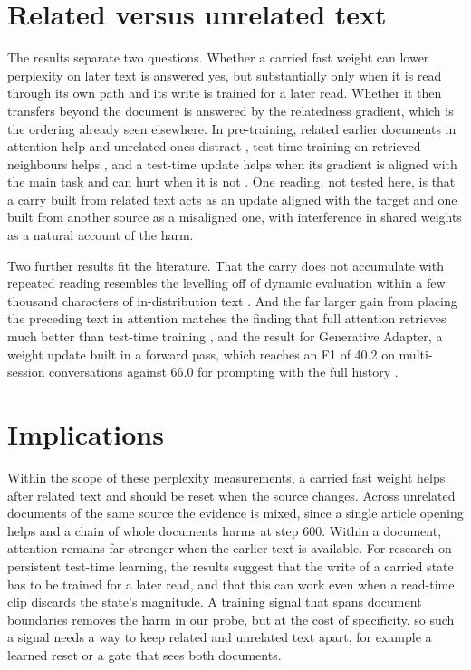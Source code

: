 \documentclass[12pt,a4paper]{report}
\begin{document}
\section{Related versus unrelated text}

The results separate two questions. Whether a carried fast weight can lower perplexity on later text is answered yes, but substantially only when it is read through its own path and its write is trained for a later read. Whether it then transfers beyond the document is answered by the relatedness gradient, which is the ordering already seen elsewhere. In pre-training, related earlier documents in attention help and unrelated ones distract \citep{zhao2024analysing}, test-time training on retrieved neighbours helps \citep{hardt2024test}, and a test-time update helps when its gradient is aligned with the main task and can hurt when it is not \citep{sun2020ttt,gandelsman2022ttt}. One reading, not tested here, is that a carry built from related text acts as an update aligned with the target and one built from another source as a misaligned one, with interference in shared weights \citep{french1999catastrophic} as a natural account of the harm.

Two further results fit the literature. That the carry does not accumulate with repeated reading resembles the levelling off of dynamic evaluation within a few thousand characters of in-distribution text \citep{krause2018dynamic}. And the far larger gain from placing the preceding text in attention matches the finding that full attention retrieves much better than test-time training \citep{tandon2025endtoend}, and the result for Generative Adapter, a weight update built in a forward pass, which reaches an F1 of 40.2 on multi-session conversations against 66.0 for prompting with the full history \citep{chen2024generative}.

\section{Implications}

Within the scope of these perplexity measurements, a carried fast weight helps after related text and should be reset when the source changes. Across unrelated documents of the same source the evidence is mixed, since a single article opening helps and a chain of whole documents harms at step 600. Within a document, attention remains far stronger when the earlier text is available. For research on persistent test-time learning, the results suggest that the write of a carried state has to be trained for a later read, and that this can work even when a read-time clip discards the state's magnitude. A training signal that spans document boundaries removes the harm in our probe, but at the cost of specificity, so such a signal needs a way to keep related and unrelated text apart, for example a learned reset or a gate that sees both documents.
\end{document}
